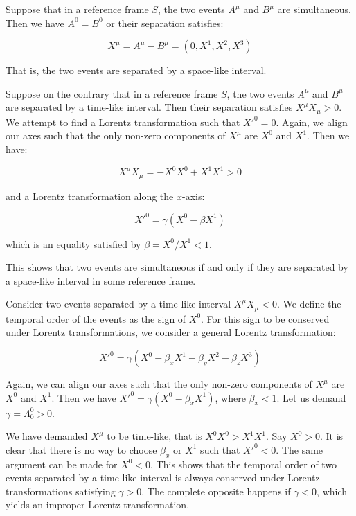 \documentclass[12pt]{article}
\begin{document}
Suppose that in a reference frame $S$, the two events $A^{\mu}$ and $B^{\mu}$ are simultaneous. Then we have $A^{0} = B^{0}$ or their separation satisfies:

\begin{equation}
    X^{\mu} = A^{\mu} - B^{\mu} = (0, X^{1}, X^{2}, X^{3})
\end{equation}

That is, the two events are separated by a space-like interval.

Suppose on the contrary that in a reference frame $S$, the two events $A^{\mu}$ and $B^{\mu}$ are separated by a time-like interval. Then their separation satisfies $X^{\mu} X_{\mu} > 0$. We attempt to find a Lorentz transformation such that $X'^{0} = 0$. Again, we align our axes such that the only non-zero components of $X^{\mu}$ are $X^{0}$ and $X^{1}$. Then we have:

\begin{equation}
    X^{\mu} X_{\mu} = -X^{0} X^{0} + X^{1} X^{1} > 0
\end{equation}

and a Lorentz transformation along the $x$-axis:

\begin{equation}
    X'^{0} = \gamma (X^{0} - \beta X^{1})
\end{equation}

which is an equality satisfied by $\beta = X^{0}/X^{1} < 1$.

This shows that two events are simultaneous if and only if they are separated by a space-like interval in some reference frame.

Consider two events separated by a time-like interval $X^{\mu} X_{\mu} < 0$. We define the temporal order of the events as the sign of $X^{0}$. For this sign to be conserved under Lorentz transformations, we consider a general Lorentz transformation:

\begin{equation}
    X'^{0} = \gamma (X^{0} - \beta_{x} X^{1} - \beta_{y} X^{2} - \beta_{z} X^{3})
\end{equation}

Again, we can align our axes such that the only non-zero components of $X^{\mu}$ are $X^{0}$ and $X^{1}$. Then we have $X'^{0} = \gamma (X^{0} - \beta_{x} X^{1})$, where $\beta_{x} < 1$. Let us demand $\gamma = \Lambda^{0}_{0} > 0$.

We have demanded $X^{\mu}$ to be time-like, that is $X^{0}X^{0} > X^{1}X^{1}$. Say $X^{0} > 0$. It is clear that there is no way to choose $\beta_{x}$ or $X^{1}$ such that $X'^{0} < 0$. The same argument can be made for $X^{0} < 0$. This shows that the temporal order of two events separated by a time-like interval is always conserved under Lorentz transformations satisfying $\gamma > 0$. The complete opposite happens if $\gamma < 0$, which yields an improper Lorentz transformation.
\end{document}
